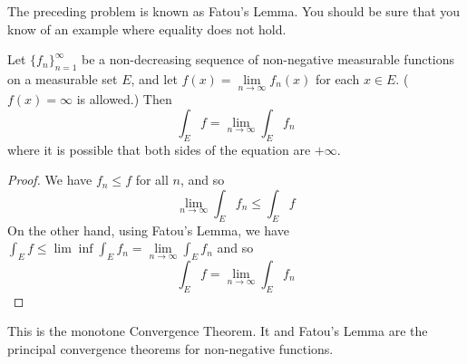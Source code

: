 \begin{rmk}%
	The preceding problem is known as Fatou's Lemma. You should be sure that you know of an 
	example where equality does not hold. 
\end{rmk}

\begin{pblm}\label{p:mct}%
	Let $\{f_n\}_{n=1}^\infty$ be a non-decreasing sequence of non-negative measurable functions 
	on a measurable set $E$, and let $f(x) = \lim\limits_{n\to\infty}f_n(x)$ for each $x \in E$. 
	($f(x) = \infty$ is allowed.) Then 
	\begin{equation*}
		\int_E f = \lim\limits_{n\to\infty}\int_Ef_n 
	\end{equation*}
	where it is possible that both sides of the equation are $+\infty$. 
\begin{proof}
	We have $f_n \le f$ for all $n$, and so 
	\begin{equation*}
		\lim\limits_{n\to\infty}\int_E f_n \le \int_E f
	\end{equation*}
	On the other hand, using Fatou's Lemma, we have 
	$%
		\int_E f \le \lim\inf \int_E f_n = \lim\limits_{n\to\infty} \int_E f_n
	$ %
	and so 
	\begin{equation*}
		\int_E f = \lim\limits_{n\to\infty}\int_E f_n
	\end{equation*}
\end{proof}
\end{pblm}

\begin{rmk}%
	This is the monotone Convergence Theorem. It and Fatou's Lemma are the principal convergence 
	theorems for non-negative functions. 
\end{rmk}

